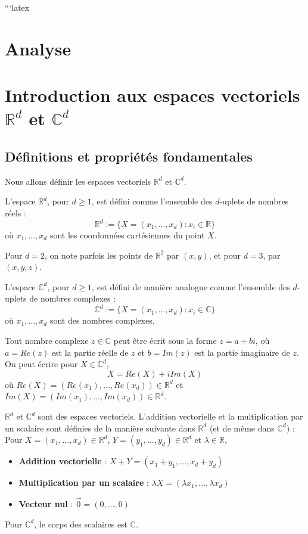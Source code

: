 ```latex

\sloppy

\section{Analyse}

\section{Introduction aux espaces vectoriels $\mathbb{R}^d$ et $\mathbb{C}^d$}

\subsection{Définitions et propriétés fondamentales}

Nous allons définir les espaces vectoriels $\mathbb{R}^d$ et $\mathbb{C}^d$.

\begin{definition}
L'espace $\mathbb{R}^d$, pour $d \geq 1$, est défini comme l'ensemble des $d$-uplets de nombres réels :
\[
\mathbb{R}^d := \{X = (x_1, \ldots, x_d) : x_i \in \mathbb{R}\}
\]
où $x_1, \ldots, x_d$ sont les coordonnées cartésiennes du point $X$.
\end{definition}

Pour $d=2$, on note parfois les points de $\mathbb{R}^2$ par $(x, y)$, et pour $d=3$, par $(x, y, z)$.

\begin{definition}
L'espace $\mathbb{C}^d$, pour $d \geq 1$, est défini de manière analogue comme l'ensemble des $d$-uplets de nombres complexes :
\[
\mathbb{C}^d := \{X = (x_1, \ldots, x_d) : x_i \in \mathbb{C}\}
\]
où $x_1, \ldots, x_d$ sont des nombres complexes.
\end{definition}

Tout nombre complexe $z \in \mathbb{C}$ peut être écrit sous la forme $z = a + bi$, où $a = Re(z)$ est la partie réelle de $z$ et $b = Im(z)$ est la partie imaginaire de $z$. On peut écrire pour $X \in \mathbb{C}^d$,
\[
X = Re(X) + i Im(X)
\]
où $Re(X) = (Re(x_1), \ldots, Re(x_d)) \in \mathbb{R}^d$ et $Im(X) = (Im(x_1), \ldots, Im(x_d)) \in \mathbb{R}^d$.

$\mathbb{R}^d$ et $\mathbb{C}^d$ sont des espaces vectoriels. L'addition vectorielle et la multiplication par un scalaire sont définies de la manière suivante dans $\mathbb{R}^d$ (et de même dans $\mathbb{C}^d$) :
Pour $X = (x_1, \ldots, x_d) \in \mathbb{R}^d$, $Y = (y_1, \ldots, y_d) \in \mathbb{R}^d$ et $\lambda \in \mathbb{R}$,
\begin{itemize}
    \item \textbf{Addition vectorielle} : $X + Y = (x_1 + y_1, \ldots, x_d + y_d)$
    \item \textbf{Multiplication par un scalaire} : $\lambda X = (\lambda x_1, \ldots, \lambda x_d)$
    \item \textbf{Vecteur nul} : $\overrightarrow{0} = (0, \ldots, 0)$
\end{itemize}
Pour $\mathbb{C}^d$, le corps des scalaires est $\mathbb{C}$.

